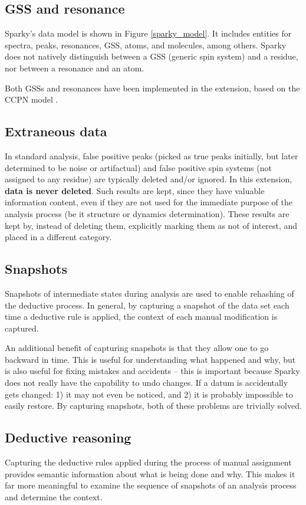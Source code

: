 \subsection{GSS and resonance}
Sparky's data model is shown in Figure \ref{sparky_model}.  It includes 
entities for spectra, peaks, resonances, GSS, atoms, and molecules, among
others.  Sparky does not natively distinguish between a GSS (generic spin 
system) and a residue, nor between a resonance and an atom.

Both GSSs and resonances have been implemented in the extension, based 
on the CCPN model \cite{ccpn}.

\subsection{Extraneous data}
In standard analysis, false positive peaks (picked as true peaks initially,
but later determined to be noise or artifactual) and false positive spin 
systems (not assigned to any residue) are typically deleted and/or ignored.
In this extension, \textbf{data is never deleted}.  Such results are kept,
since they have valuable information content, even if they are not used for
the immediate purpose of the analysis process (be it structure or dynamics
determination).  These results are kept by, instead of deleting them, 
explicitly marking them as not of interest, and placed in a different
category.

\subsection{Snapshots}
Snapshots of intermediate states during analysis are used to enable rehashing
of the deductive process.  In general, by capturing a snapshot of the data set
each time a deductive rule is applied, the context of each manual modification
is captured.

An additional benefit of capturing snapshots is that they allow one to go 
backward in time.  This is useful for understanding what happened and
why, but is also useful for fixing mistakes and accidents -- this is
important because Sparky does not really have the capability to undo
changes.  If a datum is accidentally gets changed: 1) it may not even
be noticed, and 2) it is probably impossible to easily restore.  By capturing
snapshots, both of these problems are trivially solved.

\subsection{Deductive reasoning}
Capturing the deductive rules applied during the process of manual assignment
provides semantic information about what is being done and why.  This makes it
far more meaningful to examine the sequence of snapshots of an analysis
process and determine the context.



